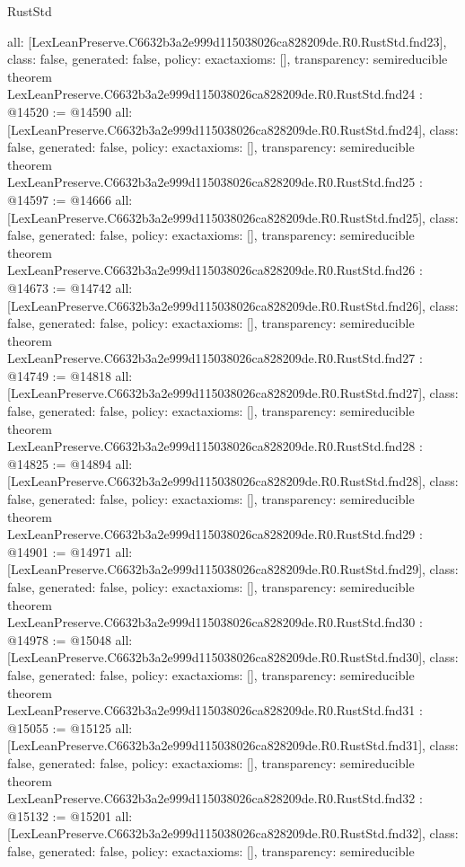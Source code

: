 \begin{lexlean}{RustStd}
\begin{coremodule}
{  all: [LexLeanPreserve.C6632b3a2e999d115038026ca828209de.R0.RustStd.fnd23],
  class: false,
  generated: false,
  policy: exact{axioms: []},
  transparency: semireducible
}
theorem LexLeanPreserve.C6632b3a2e999d115038026ca828209de.R0.RustStd.fnd24 : @14520 := @14590 {
  all: [LexLeanPreserve.C6632b3a2e999d115038026ca828209de.R0.RustStd.fnd24],
  class: false,
  generated: false,
  policy: exact{axioms: []},
  transparency: semireducible
}
theorem LexLeanPreserve.C6632b3a2e999d115038026ca828209de.R0.RustStd.fnd25 : @14597 := @14666 {
  all: [LexLeanPreserve.C6632b3a2e999d115038026ca828209de.R0.RustStd.fnd25],
  class: false,
  generated: false,
  policy: exact{axioms: []},
  transparency: semireducible
}
theorem LexLeanPreserve.C6632b3a2e999d115038026ca828209de.R0.RustStd.fnd26 : @14673 := @14742 {
  all: [LexLeanPreserve.C6632b3a2e999d115038026ca828209de.R0.RustStd.fnd26],
  class: false,
  generated: false,
  policy: exact{axioms: []},
  transparency: semireducible
}
theorem LexLeanPreserve.C6632b3a2e999d115038026ca828209de.R0.RustStd.fnd27 : @14749 := @14818 {
  all: [LexLeanPreserve.C6632b3a2e999d115038026ca828209de.R0.RustStd.fnd27],
  class: false,
  generated: false,
  policy: exact{axioms: []},
  transparency: semireducible
}
theorem LexLeanPreserve.C6632b3a2e999d115038026ca828209de.R0.RustStd.fnd28 : @14825 := @14894 {
  all: [LexLeanPreserve.C6632b3a2e999d115038026ca828209de.R0.RustStd.fnd28],
  class: false,
  generated: false,
  policy: exact{axioms: []},
  transparency: semireducible
}
theorem LexLeanPreserve.C6632b3a2e999d115038026ca828209de.R0.RustStd.fnd29 : @14901 := @14971 {
  all: [LexLeanPreserve.C6632b3a2e999d115038026ca828209de.R0.RustStd.fnd29],
  class: false,
  generated: false,
  policy: exact{axioms: []},
  transparency: semireducible
}
theorem LexLeanPreserve.C6632b3a2e999d115038026ca828209de.R0.RustStd.fnd30 : @14978 := @15048 {
  all: [LexLeanPreserve.C6632b3a2e999d115038026ca828209de.R0.RustStd.fnd30],
  class: false,
  generated: false,
  policy: exact{axioms: []},
  transparency: semireducible
}
theorem LexLeanPreserve.C6632b3a2e999d115038026ca828209de.R0.RustStd.fnd31 : @15055 := @15125 {
  all: [LexLeanPreserve.C6632b3a2e999d115038026ca828209de.R0.RustStd.fnd31],
  class: false,
  generated: false,
  policy: exact{axioms: []},
  transparency: semireducible
}
theorem LexLeanPreserve.C6632b3a2e999d115038026ca828209de.R0.RustStd.fnd32 : @15132 := @15201 {
  all: [LexLeanPreserve.C6632b3a2e999d115038026ca828209de.R0.RustStd.fnd32],
  class: false,
  generated: false,
  policy: exact{axioms: []},
  transparency: semireducible
}
\end{coremodule}
\end{lexlean}
